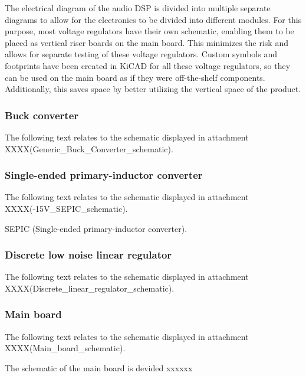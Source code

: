 The electrical diagram of the audio DSP is divided into multiple separate diagrams to allow for the electronics to be divided into different modules. For this purpose, most voltage regulators have their own schematic, enabling them to be placed as vertical riser boards on the main board. This minimizes the risk and allows for separate testing of these voltage regulators. Custom symbols and footprints have been created in KiCAD for all these voltage regulators, so they can be used on the main board as if they were off-the-shelf components. Additionally, this saves space by better utilizing the vertical space of the product.

\subsubsection{Buck converter}
The following text relates to the schematic displayed in attachment XXXX(Generic\_Buck\_Converter\_schematic).

\subsubsection{Single-ended primary-inductor converter}
The following text relates to the schematic displayed in attachment XXXX(-15V\_SEPIC\_schematic).

SEPIC (Single-ended primary-inductor converter).

\subsubsection{Discrete low noise linear regulator}
The following text relates to the schematic displayed in attachment XXXX(Discrete\_linear\_regulator\_schematic).

\subsubsection{Main board}
The following text relates to the schematic displayed in attachment XXXX(Main\_board\_schematic).

The schematic of the main board is devided xxxxxx